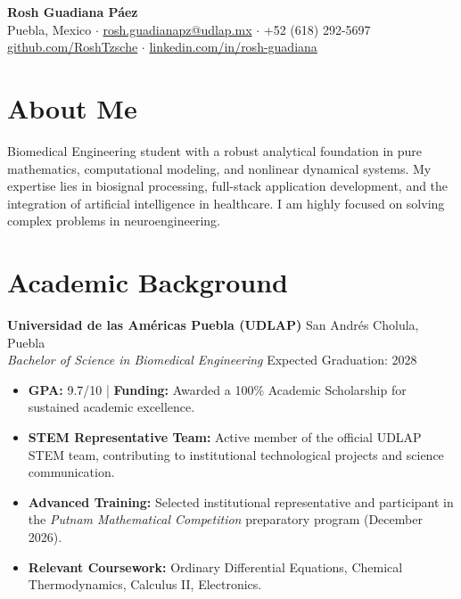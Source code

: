 \documentclass[10pt,letterpaper]{article}
\begin{document}
\pagestyle{plain}

\begin{center}
    {\LARGE \bfseries \color{primaryColor} Rosh Guadiana P\'aez} \\[6pt]
    \color{secondaryColor}
    Puebla, Mexico $\cdot$ \href{mailto:rosh.guadianapz@udlap.mx}{rosh.guadianapz@udlap.mx} $\cdot$ +52 (618) 292-5697 \\
    \href{https://github.com/RoshTzsche}{github.com/RoshTzsche} $\cdot$ \href{https://linkedin.com/in/rosh-guadiana}{linkedin.com/in/rosh-guadiana}
\end{center}

\vspace{10pt}

\section{About Me}
Biomedical Engineering student with a robust analytical foundation in pure mathematics, computational modeling, and nonlinear dynamical systems. My expertise lies in biosignal processing, full-stack application development, and the integration of artificial intelligence in healthcare. I am highly focused on solving complex problems in neuroengineering.

\section{Academic Background}
\textbf{Universidad de las Am\'ericas Puebla (UDLAP)} \hfill San Andr\'es Cholula, Puebla \\
\textit{Bachelor of Science in Biomedical Engineering} \hfill Expected Graduation: 2028
\begin{itemize}
    \item \textbf{GPA:} 9.7/10 | \textbf{Funding:} Awarded a 100\% Academic Scholarship for sustained academic excellence.
    \item \textbf{STEM Representative Team:} Active member of the official UDLAP STEM team, contributing to institutional technological projects and science communication.
    \item \textbf{Advanced Training:} Selected institutional representative and participant in the \textit{Putnam Mathematical Competition} preparatory program (December 2026).
    \item \textbf{Relevant Coursework:} Ordinary Differential Equations, Chemical Thermodynamics, Calculus II, Electronics.
\end{itemize}
\end{document}

